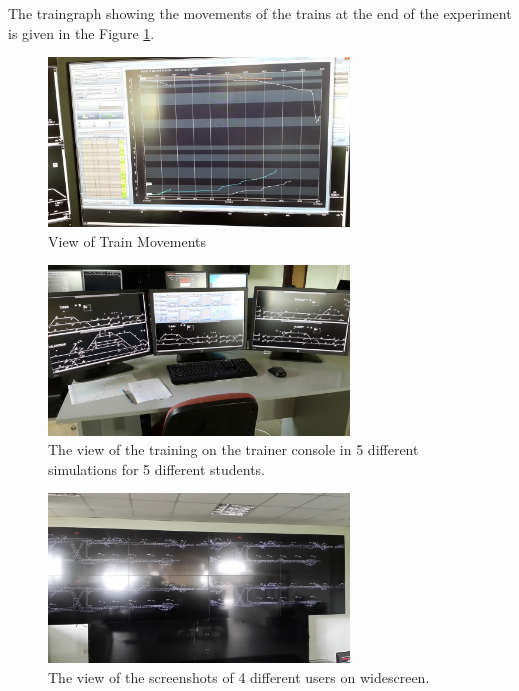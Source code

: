\documentclass[conference]{IEEEtran}
\begin{document}
The traingraph showing the movements of the trains at the end of the experiment is given in the Figure \ref{fig:trenGrapSonuc}. 
\begin{figure}[h!]
  \centering
  \includegraphics[width=8cm]{trenGrapSonuc.jpg}
  \caption{View of Train Movements}\label{fig:trenGrapSonuc}
  
\end{figure}
\begin{figure}[h!]
  \centering
  \includegraphics[width=8cm]{egitmenSonuc.jpg}
  \caption{The view of the training on the trainer console in 5 different simulations for 5 different students.}\label{fig:egitmenSonuc}
  
\end{figure}
\begin{figure}[h!]
  \centering
  \includegraphics[width=8cm]{genisekranSonuc.jpg}
  \caption{The view of the screenshots of 4 different users on widescreen.}\label{fig:genisekranSonuc}
  
\end{figure}
\end{document}
